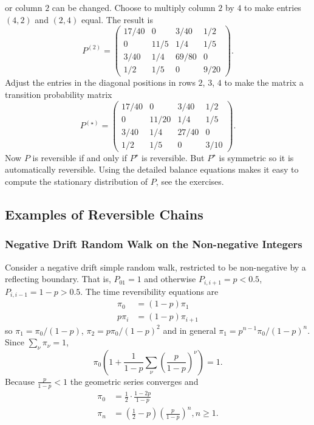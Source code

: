 \documentclass[12pt]{article}
\begin{document}
\begin{example}
    or column \( 2 \) can be changed.  Choose to multiply column \( 2 \)
    by \( 4 \) to make entries \( (4,2) \) and \( (2,4) \) equal.  The
    result is
    \[
        P^{(2)} =
        \begin{pmatrix}
            17/40       & 0     & 3/40  & 1/2 \\
            0   & 11/5  & 1/4   & 1/5 \\
            3/40        & 1/4   & 69/80 & 0 \\
            1/2 & 1/5   & 0     & 9/20
        \end{pmatrix}
        .
    \] Adjust the entries in the diagonal positions in rows \( 2 \), \(
    3 \), \( 4 \) to make the matrix a transition probability matrix
    \[
        P^{(\star)} =
        \begin{pmatrix}
            17/40       & 0     & 3/40  & 1/2 \\
            0   & 11/20 & 1/4   & 1/5 \\
            3/40        & 1/4   & 27/40 & 0 \\
            1/2 & 1/5   & 0     & 3/10
        \end{pmatrix}
        .
    \] Now \( P \) is reversible if and only if \( P^{\star} \) is
    reversible.  But \( P^{\star} \) is symmetric so it is automatically
    reversible.  Using the detailed balance equations makes it easy to
    compute the stationary distribution of \( P \), see the exercises.

\end{example}
\subsection*{Examples of Reversible Chains}

\subsubsection*{Negative Drift Random Walk on the Non-negative Integers}

Consider a negative drift simple random walk, restricted to be
non-negative by a reflecting boundary.  That is, \( P_{01} = 1 \) and
otherwise \( P_{i,i+1} = p < 0.5 \), \( P_{i,i-1} = 1 - p > 0.5 \).  The
time reversibility equations are
\begin{align*}
    \pi_0       &= (1-p) \pi_1 \\
    p \pi_{i}   &= (1-p) \pi_{i+1}
\end{align*}
so \( \pi_1 = \pi_0/(1-p) \), \( \pi_2 = p\pi_0/(1-p)^{2} \) and in
general \( \pi_1 = p^{n-1} \pi_0/(1-p)^n \).  Since \( \sum_{\nu} \pi_{\nu}
= 1 \),
\[
    \pi_0 \left( 1 + \frac{1}{1-p} \sum_{\nu} \left( \frac{p}{1-p}
    \right)^{\nu} \right) = 1.
\] Because \( \frac{p}{1-p} < 1 \) the geometric series converges and
\begin{align*}
    \pi_0       &= \frac{1}{2}\cdot \frac{1-2p}{1-p} \\
    \pi_n       &= \left( \frac{1}{2} - p \right) \left( \frac{p}{1-p}
    \right)^n, n \ge 1.
\end{align*}
\end{document}
